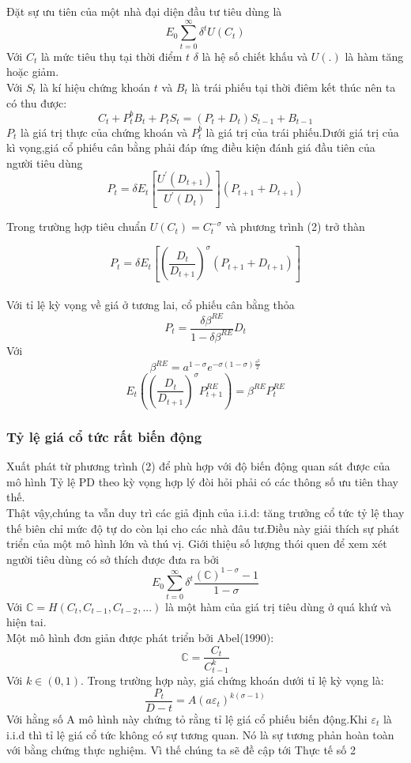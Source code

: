 \documentclass[10pt,a4paper]{article}
\begin{document}
	Đặt sự ưu tiên  của một nhà đại diện đầu tư tiêu dùng là
	$$E_0\sum_{t=0}^{\infty}\delta^tU(C_t)$$
	Với $C_t$ là mức tiêu thụ tại thời điểm $t$ $\delta$ là hệ số chiết khấu và $U(.)$ là hàm tăng hoặc giảm.\\
	Với $S_t$ là kí hiệu chứng khoán  $t$ và $B_t$ là trái phiếu tại thời điêm kết thúc nên ta có thu được:
	$$C_t+P^b_tB_t+P_tS_t=(P_t+D_t)S_{t-1}+B_{t-1}$$
	$P_t$ là giá trị thực của chứng khoán và $P^b_t $ là giá trị của trái phiếu.Dưới giá trị của kì vọng,giá cổ phiếu cân bằng phải đáp ứng điều kiện đánh giá đầu tiên của người tiêu dùng 
	\begin{equation}
	P_t=\delta E_t\left[\frac{U^{'}(D_{t+1})}{U^{'}(D_t)}\right](P_{t+1}+D_{t+1})
	\end{equation}
	
	Trong trường hợp tiêu chuẩn $U(C_t)=C^{-\sigma}_t$ và phương trình (2) trở thàn
	
	\begin{equation}
	P_t=\delta E_t\left[\left(\frac{D_t}{D_{t+1}}\right)^\sigma(P_{t+1}+D_{t+1}) \right]
	\end{equation}\\
	Với tỉ lệ kỳ vọng về giá ở tương lai, cổ phiếu cân bằng thỏa
	\begin{equation}
	P_t=\frac{\delta\beta^{RE}}{1-\delta\beta^{RE}}D_t
	\end{equation}
	Với
	\begin{equation} 
	\beta^{RE}=a^{1-\sigma}e^{-\sigma(1-\sigma)\frac{s^2}{2}}
	\end{equation}
	\begin{equation}
	E_t\left(\left(\frac{D_t}{D_{t+1}}\right)^{\sigma}P^{RE}_{t+1}\right)=\beta^{RE}P^{RE}_t
	\end{equation}
	
	\subsubsection{Tỷ lệ giá cổ tức rất biến động}
	Xuất phát từ phương trình (2) để phù hợp với độ biến động quan sát được của mô hình
	Tỷ lệ PD theo kỳ vọng hợp lý đòi hỏi phải có các thông số ưu tiên thay thế.\\
	
	Thật vậy,chúng ta vẫn duy trì các giả định của i.i.d: tăng trưởng cổ tức tỷ lệ thay thế biên chỉ mức độ tự do còn lại cho các nhà đâu tư.Điều này giải thích sự phát triển của một mô hình lớn và thú vị. Giới thiệu số lượng thói quen để xem xét người tiêu dùng có
	sở thích được đưa ra bởi
	$$E_0\sum_{t=0}^{\infty}\delta ^{t}\frac{(\mathbb C)^{1-\sigma}-1}{1-\sigma}$$
	Với $\mathbb{C}=H(C_t,C_{t-1},C_{t-2},...)$ là một hàm của giá trị tiêu dùng ở quá khứ và hiện tai.\\
	Một mô hình đơn giản được phát triển bởi Abel(1990):
	$$\mathbb{C}=\frac{C_t}{C^k_{t-1}}$$
	Với $k \in (0,1)$. Trong trường hợp này, giá chứng khoán dưới tỉ lệ kỳ vọng là:
	\begin{equation}
	\frac{P_t}{D-t}=A(a\varepsilon_t)^{k(\sigma -1)}
	\end{equation}
	Với hằng số A mô hình này chứng tỏ rằng tỉ lệ giá cổ phiếu biến động.Khi $\varepsilon _t$ là i.i.d thì tỉ lệ giá cổ tức không có sự tương quan. Nó là sự tương phản hoàn toàn  với bằng chứng thực nghiệm. Vì thế chúng ta sẽ đề cập tới Thực tế số 2
\end{document}
